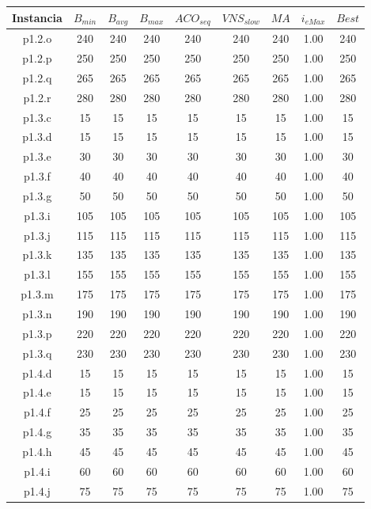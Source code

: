 \begin{table}
\begin{center}
\begin{tabular}{ |c|c|c|c|c|c|c|c|c| } 
\hline
Instancia & $B_{min}$ & $B_{avg}$ & $B_{max}$ & $ACO_{seq}$ & $VNS_{slow}$ & $MA$ & $i_{eMax}$ & $Best$ \\
\hline
p1.2.o & 240 & 240 & 240 & 240 & 240 & 240 & 1.00 & 240  \\
p1.2.p & 250 & 250 & 250 & 250 & 250 & 250 & 1.00 & 250  \\
p1.2.q & 265 & 265 & 265 & 265 & 265 & 265 & 1.00 & 265  \\
p1.2.r & 280 & 280 & 280 & 280 & 280 & 280 & 1.00 & 280  \\
p1.3.c & 15 & 15 & 15 & 15 & 15 & 15 & 1.00 & 15  \\
p1.3.d & 15 & 15 & 15 & 15 & 15 & 15 & 1.00 & 15  \\
p1.3.e & 30 & 30 & 30 & 30 & 30 & 30 & 1.00 & 30  \\
p1.3.f & 40 & 40 & 40 & 40 & 40 & 40 & 1.00 & 40  \\
p1.3.g & 50 & 50 & 50 & 50 & 50 & 50 & 1.00 & 50  \\
p1.3.i & 105 & 105 & 105 & 105 & 105 & 105 & 1.00 & 105  \\
p1.3.j & 115 & 115 & 115 & 115 & 115 & 115 & 1.00 & 115  \\
p1.3.k & 135 & 135 & 135 & 135 & 135 & 135 & 1.00 & 135  \\
p1.3.l & 155 & 155 & 155 & 155 & 155 & 155 & 1.00 & 155  \\
p1.3.m & 175 & 175 & 175 & 175 & 175 & 175 & 1.00 & 175  \\
p1.3.n & 190 & 190 & 190 & 190 & 190 & 190 & 1.00 & 190  \\
p1.3.p & 220 & 220 & 220 & 220 & 220 & 220 & 1.00 & 220  \\
p1.3.q & 230 & 230 & 230 & 230 & 230 & 230 & 1.00 & 230  \\
p1.4.d & 15 & 15 & 15 & 15 & 15 & 15 & 1.00 & 15  \\
p1.4.e & 15 & 15 & 15 & 15 & 15 & 15 & 1.00 & 15  \\
p1.4.f & 25 & 25 & 25 & 25 & 25 & 25 & 1.00 & 25  \\
p1.4.g & 35 & 35 & 35 & 35 & 35 & 35 & 1.00 & 35  \\
p1.4.h & 45 & 45 & 45 & 45 & 45 & 45 & 1.00 & 45  \\
p1.4.i & 60 & 60 & 60 & 60 & 60 & 60 & 1.00 & 60  \\
p1.4.j & 75 & 75 & 75 & 75 & 75 & 75 & 1.00 & 75  \\

\end{tabular}
\end{center}
\end{table}
